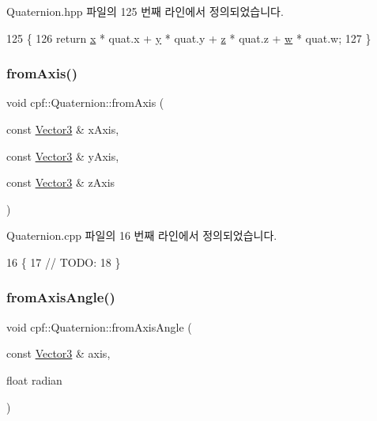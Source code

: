 Quaternion.\+hpp 파일의 125 번째 라인에서 정의되었습니다.


\begin{DoxyCode}
125                                                 \{
126             \textcolor{keywordflow}{return} \hyperlink{classcpf_1_1_quaternion_a200f7bce4e673281af8cc7dd75cb0677}{x} * quat.x + \hyperlink{classcpf_1_1_quaternion_a4fbade6e58be55a49c94e7f157988136}{y} * quat.y + \hyperlink{classcpf_1_1_quaternion_ade9c41b717605118e5fdf95d96a843b4}{z} * quat.z + \hyperlink{classcpf_1_1_quaternion_af312a196b39bb4903b876bc454ac15f8}{w} * quat.w;
127         \}
\end{DoxyCode}
\mbox{\label{classcpf_1_1_quaternion_ae9fbd4524f10dd2b2cd6108cf6adbd22}} 
\subsubsection{\texorpdfstring{from\+Axis()}{fromAxis()}}
{\footnotesize\ttfamily void cpf\+::\+Quaternion\+::from\+Axis (\begin{DoxyParamCaption}\item[{const \hyperlink{namespacecpf_a50675f369f5384c7543c7672e3441ba0}{Vector3} \&}]{x\+Axis,  }\item[{const \hyperlink{namespacecpf_a50675f369f5384c7543c7672e3441ba0}{Vector3} \&}]{y\+Axis,  }\item[{const \hyperlink{namespacecpf_a50675f369f5384c7543c7672e3441ba0}{Vector3} \&}]{z\+Axis }\end{DoxyParamCaption})}



Quaternion.\+cpp 파일의 16 번째 라인에서 정의되었습니다.


\begin{DoxyCode}
16                                                                                               \{
17         \textcolor{comment}{// TODO:}
18     \}
\end{DoxyCode}
\mbox{\label{classcpf_1_1_quaternion_a7d0860d74452a6b5de4ea70357bf3d95}} 
\subsubsection{\texorpdfstring{from\+Axis\+Angle()}{fromAxisAngle()}}
{\footnotesize\ttfamily void cpf\+::\+Quaternion\+::from\+Axis\+Angle (\begin{DoxyParamCaption}\item[{const \hyperlink{namespacecpf_a50675f369f5384c7543c7672e3441ba0}{Vector3} \&}]{axis,  }\item[{float}]{radian }\end{DoxyParamCaption})}

